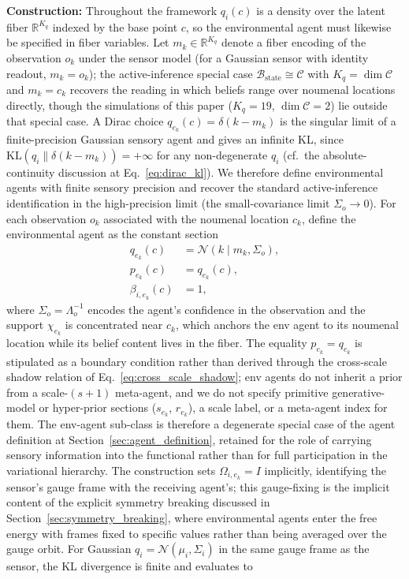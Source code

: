 \documentclass[11pt]{article}
\begin{document}
\textbf{Construction:} Throughout the framework $q_i(c)$ is a density over the latent fiber $\mathbb{R}^{K_q}$ indexed by the base point $c$, so the environmental agent must likewise be specified in fiber variables. Let $m_k \in \mathbb{R}^{K_q}$ denote a fiber encoding of the observation $o_k$ under the sensor model (for a Gaussian sensor with identity readout, $m_k = o_k$); the active-inference special case $\mathcal{B}_{\mathrm{state}} \cong \mathcal{C}$ with $K_q = \dim\mathcal{C}$ and $m_k = c_k$ recovers the reading in which beliefs range over noumenal locations directly, though the simulations of this paper ($K_q = 19$, $\dim\mathcal{C} = 2$) lie outside that special case. A Dirac choice $q_{e_k}(c) = \delta(k - m_k)$ is the singular limit of a finite-precision Gaussian sensory agent and gives an infinite KL, since $\mathrm{KL}(q_i \| \delta(k - m_k)) = +\infty$ for any non-degenerate $q_i$ (cf.\ the absolute-continuity discussion at Eq.~\eqref{eq:dirac_kl}). We therefore define environmental agents with finite sensory precision and recover the standard active-inference identification in the high-precision limit (the small-covariance limit $\Sigma_o \to 0$). For each observation $o_k$ associated with the noumenal location $c_k$, define the environmental agent as the constant section
\begin{align}
q_{e_k}(c) &= \mathcal{N}(k \mid m_k, \Sigma_o), \\
p_{e_k}(c) &= q_{e_k}(c), \\
\beta_{i,e_k}(c) &= 1,
\end{align}
where $\Sigma_o = \Lambda_o^{-1}$ encodes the agent's confidence in the observation and the support $\chi_{e_k}$ is concentrated near $c_k$, which anchors the env agent to its noumenal location while its belief content lives in the fiber. The equality $p_{e_k} = q_{e_k}$ is stipulated as a boundary condition rather than derived through the cross-scale shadow relation of Eq.~\eqref{eq:cross_scale_shadow}; env agents do not inherit a prior from a scale-$(s+1)$ meta-agent, and we do not specify primitive generative-model or hyper-prior sections ($s_{e_k}$, $r_{e_k}$), a scale label, or a meta-agent index for them. The env-agent sub-class is therefore a degenerate special case of the agent definition at Section~\ref{sec:agent_definition}, retained for the role of carrying sensory information into the functional rather than for full participation in the variational hierarchy. The construction sets $\Omega_{i,e_k} = I$ implicitly, identifying the sensor's gauge frame with the receiving agent's; this gauge-fixing is the implicit content of the explicit symmetry breaking discussed in Section~\ref{sec:symmetry_breaking}, where environmental agents enter the free energy with frames fixed to specific values rather than being averaged over the gauge orbit. For Gaussian $q_i = \mathcal{N}(\mu_i, \Sigma_i)$ in the same gauge frame as the sensor, the KL divergence is finite and evaluates to
\end{document}
